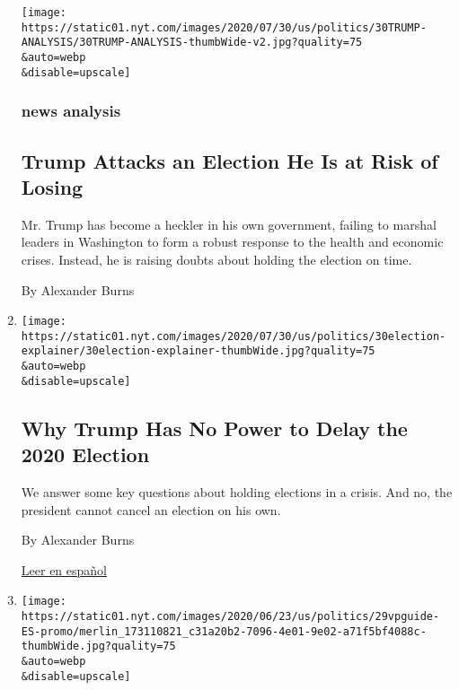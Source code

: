 \begin{enumerate}
  \texttt{[image: https://static01.nyt.com/images/2020/07/30/us/politics/30TRUMP-ANALYSIS/30TRUMP-ANALYSIS-thumbWide-v2.jpg?quality=75\\\&auto=webp\\\&disable=upscale]}

  \hypertarget{news-analysis}{%
  \subsubsection{news analysis}\label{news-analysis}}

  \hypertarget{trump-attacks-an-election-he-is-at-risk-of-losing}{%
  \subsection{Trump Attacks an Election He Is at Risk of
  Losing}\label{trump-attacks-an-election-he-is-at-risk-of-losing}}

  Mr. Trump has become a heckler in his own government, failing to
  marshal leaders in Washington to form a robust response to the health
  and economic crises. Instead, he is raising doubts about holding the
  election on time.

  By Alexander Burns
\item
  \href{/2020/07/30/us/politics/trump-postpone-election.html}{}

  \texttt{[image: https://static01.nyt.com/images/2020/07/30/us/politics/30election-explainer/30election-explainer-thumbWide.jpg?quality=75\\\&auto=webp\\\&disable=upscale]}

  \hypertarget{why-trump-has-no-power-to-delay-the-2020-election}{%
  \subsection{Why Trump Has No Power to Delay the 2020
  Election}\label{why-trump-has-no-power-to-delay-the-2020-election}}

  We answer some key questions about holding elections in a crisis. And
  no, the president cannot cancel an election on his own.

  By Alexander Burns

  \href{https://www.nytimes.com/es/2020/07/30/espanol/estados-unidos/trump-retrasar-elecciones.html}{Leer
  en español}
\item
  \href{/es/2020/07/29/espanol/estados-unidos/biden-vicepresidente.html}{}

  \texttt{[image: https://static01.nyt.com/images/2020/06/23/us/politics/29vpguide-ES-promo/merlin\_173110821\_c31a20b2-7096-4e01-9e02-a71f5bf4088c-thumbWide.jpg?quality=75\\\&auto=webp\\\&disable=upscale]}


\end{enumerate}
